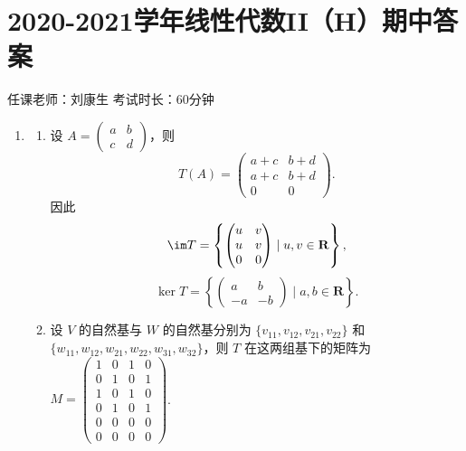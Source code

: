 \section{2020-2021学年线性代数II（H）期中答案}

\begin{center}
    任课老师：刘康生\hspace{4em} 考试时长：60分钟
\end{center}
\begin{enumerate}
    \item \begin{enumerate}
        \item 设 $A=\begin{pmatrix}a & b\\c & d\end{pmatrix}$，则
        \[
            T(A)=\begin{pmatrix}a+c & b+d\\a+c & b+d\\0 & 0\end{pmatrix}.
        \]
        因此
        \[
            \im T=\left\{\begin{pmatrix}u & v\\u & v\\0 & 0\end{pmatrix}\mid u,v\in\mathbf{R}\right\},
        \]
        \[
            \ker T=\left\{\begin{pmatrix}a & b\\-a & -b\end{pmatrix}\mid a,b\in\mathbf{R}\right\}.
        \]
        \item 设 $V$ 的自然基与 $W$ 的自然基分别为 $\{v_{11}, v_{12}, v_{21}, v_{22}\}$ 和 $\{w_{11}, w_{12}, w_{21}, w_{22}, w_{31}, w_{32}\}$，则 $T$ 在这两组基下的矩阵为 $M=\begin{pmatrix}1 & 0 & 1 & 0\\0 & 1 & 0 & 1\\1 & 0 & 1 & 0\\0 & 1 & 0 & 1\\0 & 0 & 0 & 0\\0 & 0 & 0 & 0\end{pmatrix}$.


\end{enumerate}
\end{enumerate}
